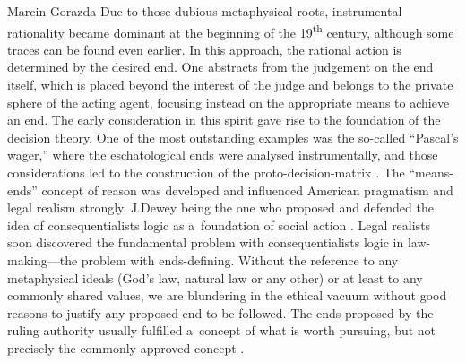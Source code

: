 \begin{artengenv}{Marcin Gorazda}
Due to those dubious metaphysical roots, instrumental rationality became dominant at the beginning of the 19\textsuperscript{th} century, although some traces can be found even earlier. In this approach, the rational action is determined by the desired end. One abstracts from the judgement on the end itself, which is placed beyond the interest of the judge and belongs to the private sphere of the acting agent, focusing instead on the appropriate means to achieve an end. The early consideration in this spirit gave rise to the foundation of the decision theory. One of the most outstanding examples was the so-called ``Pascal's wager,'' where the eschatological ends were analysed instrumentally, and those considerations led to the construction of the proto-decision-matrix
\parencite[][]{jordan_pascals_2006}. %
 The ``means-ends'' concept of reason was developed and influenced American pragmatism and legal realism strongly, J.Dewey being the one who proposed and defended the idea of consequentialists logic as a~foundation of social action 
\parencite[][]{dewey_logical_1924}. %
 Legal realists soon discovered the fundamental problem with consequentialists logic in law-making---the problem with ends-defining. Without the reference to any metaphysical ideals (God's law, natural law or any other) or at least to any commonly shared values, we are blundering in the ethical vacuum without good reasons to justify any proposed end to be followed. The ends proposed by the ruling authority usually fulfilled a~concept of what is worth pursuing, but not precisely the commonly approved concept 
\parencites[][]{pound_social_2006}[][]{gorazda_law_2017}.%



\end{artengenv}

